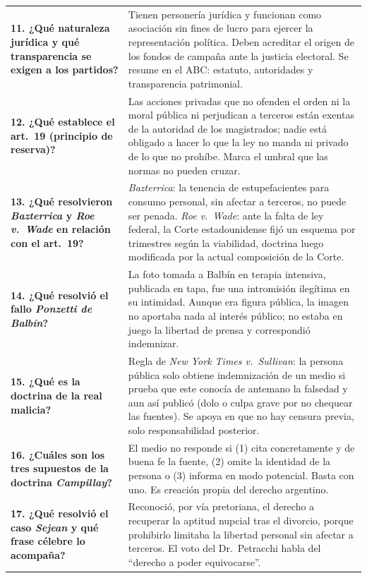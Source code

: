 \documentclass[12pt,oneside]{book}
\begin{document}
\begin{longtable}{
    >{\raggedright\arraybackslash}p{}
    >{\raggedright\arraybackslash}p{}
}
\textbf{11. ¿Qué naturaleza jurídica y qué transparencia se exigen a los partidos?} &
Tienen personería jurídica y funcionan como asociación sin fines de lucro para ejercer la representación política. Deben acreditar el origen de los fondos de campaña ante la justicia electoral. Se resume en el ABC: estatuto, autoridades y transparencia patrimonial. \\

\textbf{12. ¿Qué establece el art.\ 19 (principio de reserva)?} &
Las acciones privadas que no ofenden el orden ni la moral pública ni perjudican a terceros están exentas de la autoridad de los magistrados; nadie está obligado a hacer lo que la ley no manda ni privado de lo que no prohíbe. Marca el umbral que las normas no pueden cruzar. \\

\textbf{13. ¿Qué resolvieron \emph{Bazterrica} y \emph{Roe v.\ Wade} en relación con el art.\ 19?} &
\emph{Bazterrica}: la tenencia de estupefacientes para consumo personal, sin afectar a terceros, no puede ser penada. \emph{Roe v.\ Wade}: ante la falta de ley federal, la Corte estadounidense fijó un esquema por trimestres según la viabilidad, doctrina luego modificada por la actual composición de la Corte. \\

\textbf{14. ¿Qué resolvió el fallo \emph{Ponzetti de Balbín}?} &
La foto tomada a Balbín en terapia intensiva, publicada en tapa, fue una intromisión ilegítima en su intimidad. Aunque era figura pública, la imagen no aportaba nada al interés público; no estaba en juego la libertad de prensa y correspondió indemnizar. \\

\textbf{15. ¿Qué es la doctrina de la real malicia?} &
Regla de \emph{New York Times v.\ Sullivan}: la persona pública solo obtiene indemnización de un medio si prueba que este conocía de antemano la falsedad y aun así publicó (dolo o culpa grave por no chequear las fuentes). Se apoya en que no hay censura previa, solo responsabilidad posterior. \\

\textbf{16. ¿Cuáles son los tres supuestos de la doctrina \emph{Campillay}?} &
El medio no responde si (1) cita concretamente y de buena fe la fuente, (2) omite la identidad de la persona o (3) informa en modo potencial. Basta con uno. Es creación propia del derecho argentino. \\

\textbf{17. ¿Qué resolvió el caso \emph{Sejean} y qué frase célebre lo acompaña?} &
Reconoció, por vía pretoriana, el derecho a recuperar la aptitud nupcial tras el divorcio, porque prohibirlo limitaba la libertad personal sin afectar a terceros. El voto del Dr.\ Petracchi habla del ``derecho a poder equivocarse''. \\


\end{longtable}
\end{document}
